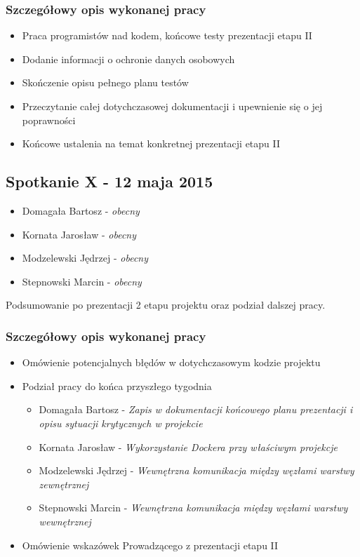 \subsubsection*[Szczegółowy opis wykonanej pracy]{Szczegółowy opis wykonanej pracy}
\begin{itemize}
\item Praca programistów nad kodem, końcowe testy prezentacji etapu II
\item Dodanie informacji o ochronie danych osobowych
\item Skończenie opisu pełnego planu testów
\item Przeczytanie całej dotychczasowej dokumentacji i upewnienie się o jej poprawności
\item Końcowe ustalenia na temat konkretnej prezentacji etapu II
\end{itemize}

\subsection[Spotkanie X - 12 maja 2015]{Spotkanie X - 12 maja 2015}

\begin{itemize}
\item Domagała Bartosz - \textit{obecny}
\item Kornata Jarosław - \textit{obecny}
\item Modzelewski Jędrzej - \textit{obecny}
\item Stepnowski Marcin - \textit{obecny}
\end{itemize}

\par{Podsumowanie po prezentacji 2 etapu projektu oraz podział dalszej pracy.}

\subsubsection*[Szczegółowy opis wykonanej pracy]{Szczegółowy opis wykonanej pracy}
\begin{itemize}
\item Omówienie potencjalnych błędów w dotychczasowym kodzie projektu
\item Podział pracy do końca przyszłego tygodnia
	\begin{itemize}
	\item Domagała Bartosz - \textit{Zapis w dokumentacji końcowego planu prezentacji i opisu sytuacji krytycznych w projekcie}
	\item Kornata Jarosław - \textit{Wykorzystanie Dockera przy właściwym projekcje}
	\item Modzelewski Jędrzej - \textit{Wewnętrzna komunikacja między węzłami warstwy zewnętrznej}
	\item Stepnowski Marcin - \textit{Wewnętrzna komunikacja między węzłami warstwy wewnętrznej}
	\end{itemize}
\item Omówienie wskazówek Prowadzącego z prezentacji etapu II
\end{itemize}

